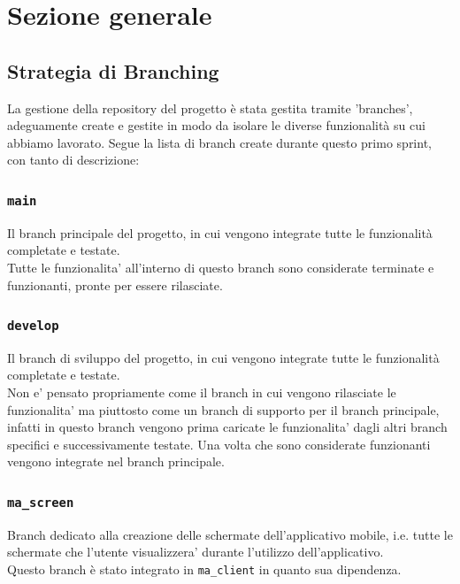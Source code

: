 \documentclass{article}
\begin{document}
\clearpage


\section{Sezione generale}

\subsection{Strategia di Branching}

La gestione della repository del progetto è stata gestita tramite 'branches', adeguamente create e gestite in modo da isolare le diverse funzionalità su cui abbiamo lavorato. 
Segue la lista di branch create durante questo primo sprint, con tanto di descrizione:

\subsubsection{\texttt{main}}
Il branch principale del progetto, in cui vengono integrate tutte le funzionalità completate e testate.\\
Tutte le funzionalita' all'interno di questo branch sono considerate terminate e funzionanti, pronte per essere rilasciate.\\

\subsubsection{\texttt{develop}}
Il branch di sviluppo del progetto, in cui vengono integrate tutte le funzionalità completate e testate.\\
Non e' pensato propriamente come il branch in cui vengono rilasciate le funzionalita' ma piuttosto come un branch di supporto per il branch principale, infatti in questo branch vengono prima caricate le funzionalita' dagli altri branch specifici e successivamente testate. Una volta che sono considerate funzionanti vengono integrate nel branch principale.\\

\subsubsection{\texttt{ma\_screen}}
Branch dedicato alla creazione delle schermate dell'applicativo mobile, i.e. tutte le schermate che l'utente visualizzera' durante l'utilizzo dell'applicativo.\\
Questo branch è stato integrato in \texttt{ma\_client} in quanto sua dipendenza.
\end{document}
